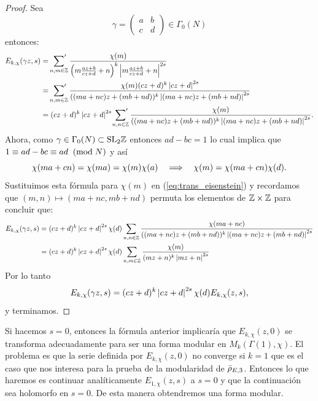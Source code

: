 \documentclass[../../tesis_maestria]{subfiles}
\begin{document}
\begin{proof}
Sea
\[
  \gamma=\begin{pmatrix}a & b\\ c&d\end{pmatrix} \in \Gamma_0(N)
\]
entonces:
\begin{align}
  E_{k,\chi}(\gamma z,s)&=
  \sideset{}{'}\sum_{n,m\in\ZZ}
  \frac{\chi(m)}{\paren{m\frac{az+b}{cz+d}+n}^k\abs{m\frac{az+b}{cz+d}+n}^{2s}}\nonumber\\ & =
  \sideset{}{'}\sum_{n,m\in\ZZ}%
  \frac{\chi(m)(cz+d)^k\abs{cz+d}^{2s}}{((ma+nc)z+(mb+nd))^k\abs{(ma+nc)z+(mb+nd)}^{2s}}\nonumber\\ & =
  (cz+d)^k\abs{cz+d}^{2s}\sideset{}{'}\sum_{n,n\in\ZZ}
  \frac{\chi(m)}{((ma+nc)z+(mb+nd))^k\abs{(ma+nc)z+(mb+nd)}^{2s}}.\label{eq:trans_eisenstein}
\end{align}
Ahora, como $\gamma\in\Gamma_0(N)\subset\mathrm{SL}_2\mathbb{Z}$ entonces $ad-bc=1$ lo cual implica que
$1\equiv ad-bc\equiv ad \;\;(\mathrm{mod}\; N)$ y as\'i
\[
\chi(ma+cn)=\chi(ma)=\chi(m)\chi(a) \quad\Longrightarrow\quad
\chi(m)=\chi(ma+cn)\chi(d).
\]
Sustituimos esta f\'ormula para $\chi(m)$ en (\ref{eq:trans_eisenstein}) y recordamos que
$(m,n)\mapsto(ma+nc,mb+nd)$ permuta los elementos de $\mathbb{Z}\times\mathbb{Z}$ para concluir que:
\begin{align*}
  E_{k,\chi}(\gamma z,s)&=
  (cz+d)^k\left| cz+d \right|^{2s}\chi(d)\sum_{n,n\in\mathbb{Z}}
  \frac{\chi(ma+nc)}{((ma+nc)z+(mb+nd))^k\left| (ma+nc)z+(mb+nd) \right|^{2s}} \\ & =
  (cz+d)^k\left| cz+d \right|^{2s}\chi(d)\sum_{n,m\in\mathbb{Z}}\frac{\chi(m)}{(mz+n)^{k}\left| mz+n \right|^{2s}}
\end{align*}
Por lo tanto
\begin{equation*}
  E_{k,\chi}(\gamma z,s) =(cz+d)^k\left| cz+d \right|^{2s}\chi(d) E_{k,\chi}(z,s),
\end{equation*}
y terminamos.
\end{proof}

Si hacemos $s=0$, entonces la f\'ormula anterior implicar\'ia que $E_{k,\chi}(z,0)$
se transforma adecuadamente para ser una forma modular en $M_k(\Gamma(1),\chi)$. El
problema es que la serie definida por $E_{k,\chi}(z,0)$ no converge si $k=1$ que es el
caso que nos interesa para la prueba de la modularidad de $\bar{\rho}_{E,3}$. Entonces lo que haremos
es continuar anal\'iticamente $E_{1,\chi}(z,s)$ a $s=0$ y que la continuaci\'on sea holomorfo
en $s=0$. De esta manera obtendremos una forma modular.
\end{document}
